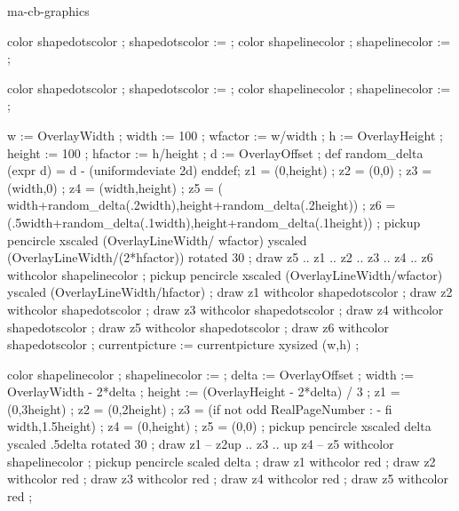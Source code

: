 \startenvironment ma-cb-graphics


\definecolor[ShapeDarkLine]  [s=.4]
\definecolor[ShapeDarkDots]  [r=1]
\definecolor[ShapeDarkEnd]   [g=1]
\definecolor[ShapeLightLine] [s=.95]
\definecolor[ShapeLightDots] [r=.9,g=,5,b=.5]
\definecolor[ShapeLightFill] [s=.95]
\definecolor[ShapeLightFrame][r=.5,g=.50,b=.9]

    color shapedotscolor ; shapedotscolor :=  ;
    color shapelinecolor ; shapelinecolor :=  ;
\stopuseMPgraphic

    color shapedotscolor ; shapedotscolor :=  ;
    color shapelinecolor ; shapelinecolor :=  ;
\stopuseMPgraphic

    w := OverlayWidth  ; width  := 100 ; wfactor := w/width ;
    h := OverlayHeight ; height := 100 ; hfactor := h/height ;
    d := OverlayOffset ;
    def random_delta (expr d) =
        d - (uniformdeviate 2d)
    enddef;
    z1 = (0,height) ;
    z2 = (0,0) ;
    z3 = (width,0) ;
    z4 = (width,height) ;
    z5 = (  width+random_delta(.2width),height+random_delta(.2height)) ;
    z6 = (.5width+random_delta(.1width),height+random_delta(.1height)) ;
    pickup pencircle
        xscaled (OverlayLineWidth/   wfactor)
        yscaled (OverlayLineWidth/(2*hfactor))
        rotated 30 ;
    draw z5 .. z1 .. z2 .. z3 .. z4 .. z6 withcolor shapelinecolor ;
    pickup pencircle
        xscaled (OverlayLineWidth/wfactor)
        yscaled (OverlayLineWidth/hfactor) ;
    draw z1 withcolor shapedotscolor ;
    draw z2 withcolor shapedotscolor ;
    draw z3 withcolor shapedotscolor ;
    draw z4 withcolor shapedotscolor ;
    draw z5 withcolor shapedotscolor ;
    draw z6 withcolor shapedotscolor ;
    currentpicture := currentpicture xysized (w,h) ;
\stopuseMPgraphic

    color shapelinecolor ; shapelinecolor :=  ;
    delta  := OverlayOffset ;
    width  := OverlayWidth - 2*delta ;
    height := (OverlayHeight - 2*delta) / 3 ;
    z1 = (0,3height) ;
    z2 = (0,2height) ;
    z3 = (if not odd RealPageNumber : - fi width,1.5height) ;
    z4 = (0,height) ;
    z5 = (0,0) ;
    pickup pencircle
        xscaled delta
        yscaled .5delta
        rotated 30 ;
    draw z1 -- z2{up} .. z3 .. {up} z4 -- z5 withcolor shapelinecolor ;
    pickup pencircle
        scaled delta ;
    draw z1 withcolor red ;
    draw z2 withcolor red ;
    draw z3 withcolor red ;
    draw z4 withcolor red ;
    draw z5 withcolor red ;
\stopuniqueMPpagegraphic

